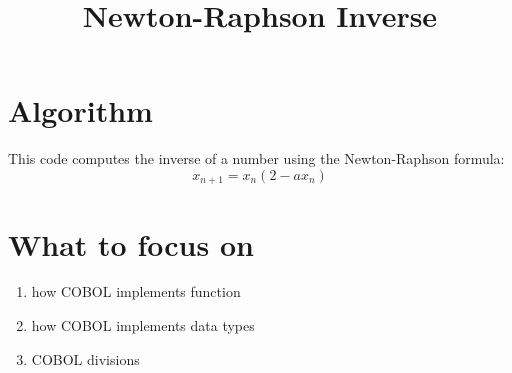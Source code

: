 \documentclass[letter,12pt]{article}
\begin{document}
\title{Newton-Raphson Inverse} 
\maketitle

\section{Algorithm}
This code computes the inverse of a number using the Newton-Raphson formula:
\begin{equation}
    x_{n+1}=x_n(2-ax_n)
\end{equation}

\section{What to focus on}
\begin{enumerate}
    \item how COBOL implements function
    \item how COBOL implements data types
    \item COBOL divisions
\end{enumerate}
\end{document}
